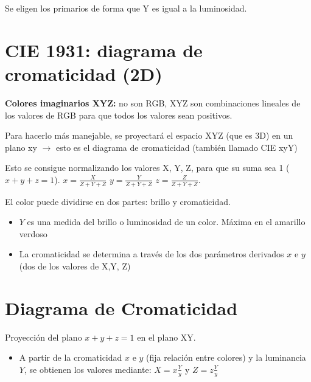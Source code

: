 Se eligen los primarios de forma que Y es igual a la luminosidad.

\section{CIE 1931: diagrama de cromaticidad (2D)}
\textbf{Colores imaginarios XYZ:} no son RGB, XYZ son combinaciones lineales de los valores de RGB para que todos los valores sean positivos.

Para hacerlo más manejable, se proyectará el espacio XYZ (que es 3D) en un plano xy $\rightarrow$ esto es el diagrama de cromaticidad (también llamado CIE xyY)

Esto se consigue normalizando los valores X, Y, Z, para que su suma sea 1 ($x+y+z=1$). $x=\frac{X}{Z+Y+Z}$ $y=\frac{Y}{Z+Y+Z}$ $z=\frac{Z}{Z+Y+Z}$.

El color puede dividirse en dos partes: brillo y cromaticidad.
\begin{itemize}
    \item $Y$ es una medida del brillo o luminosidad de un color. Máxima en el amarillo verdoso
    \item La cromaticidad se determina a través de los dos parámetros derivados $x$ e $y$ (dos
    de los valores de X,Y, Z)
\end{itemize}

\section{Diagrama de Cromaticidad}
Proyección del plano $x+y+z=1$ en el plano XY.
\begin{itemize}
    \item A partir de la cromaticidad $x$ e $y$ (fija relación entre colores) y la luminancia $Y$, se obtienen los valores mediante: $X=x\frac{Y}{y}$ y $Z=z\frac{Y}{y}$
\end{itemize}

